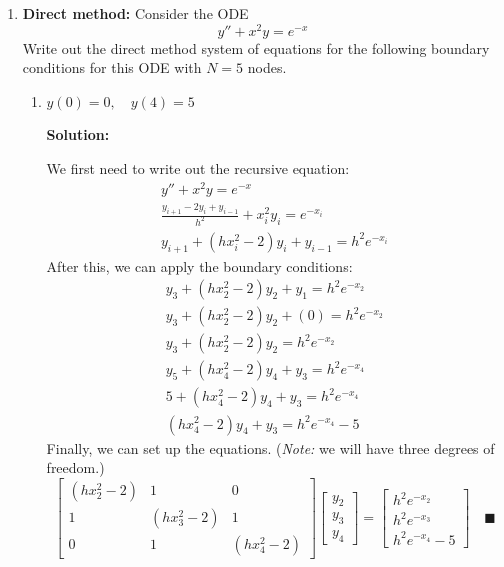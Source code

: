 \documentclass[letterpaper, fontsize=11pt]{scrartcl} %
\numberwithin{equation}{section} %
\numberwithin{figure}{section} %
\numberwithin{table}{section} %
\begin{document}
\begin{enumerate}
\begin{enumerate}
\end{enumerate}

\item \textbf{Direct method:} Consider the ODE
\[ y'' + x^2y = e^{-x}\]
Write out the direct method system of equations for the following boundary conditions for this ODE with $N=5$ nodes.
\begin{enumerate}

\item $y(0) = 0, \quad y(4) = 5$
\par \textbf{Solution:} 
\par We first need to write out the recursive equation:
\begin{gather*}
y'' + x^2y = e^{-x}\\
\frac{y_{i+1} - 2y_i + y_{i-1}}{h^2} + x_i^2y_i = e^{-x_i}\\
y_{i+1}+ (hx_i^2- 2)y_i + y_{i-1}= h^2e^{-x_i}
\end{gather*}
After this, we can apply the boundary conditions: 
\begin{gather*}
y_{3}+ (hx_2^2- 2)y_2 + y_{1}= h^2e^{-x_2} \\
y_{3}+ (hx_2^2- 2)y_2 + (0)= h^2e^{-x_2} \\
y_{3}+ (hx_2^2- 2)y_2= h^2e^{-x_2} \\
y_{5}+ (hx_4^2- 2)y_4 + y_{3}= h^2e^{-x_4} \\
5+ (hx_4^2- 2)y_4 + y_{3}= h^2e^{-x_4} \\
(hx_4^2- 2)y_4 + y_{3}= h^2e^{-x_4} - 5
\end{gather*}
Finally, we can set up the equations. (\textit{Note:} we will have three degrees of freedom.)
\[
\left[\begin{array}{ccc} 
(hx_2^2- 2) & 1 & 0\\
1 &  (hx_3^2- 2) & 1 \\
0 & 1 &  (hx_4^2- 2)\end{array} \right]
\left[ \begin{array}{c} y_2 \\ y_3 \\ y_4\end{array} \right] 
= \left[ \begin{array}{c} h^2e^{-x_2} \\ h^2e^{-x_3} \\ h^2e^{-x_4} - 5\end{array} \right] \quad\blacksquare
\]


\end{enumerate}
\end{enumerate}
\end{document}
